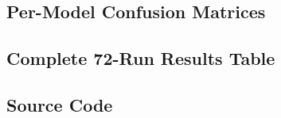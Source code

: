 \documentclass[12pt,a4paper]{article}
\begin{document}
\subsection{Per-Model Confusion Matrices}
\label{appx:confusion}


\let\includegraphics\oldincludegraphics %



\subsection{Complete 72-Run Results Table}
\label{appx:full-results}


\subsection{Source Code}
\label{appx:source-code}

\end{document}
